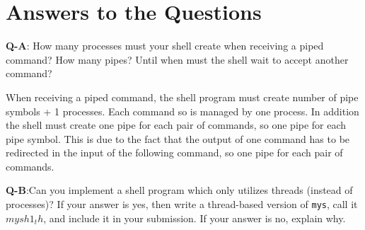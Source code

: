 





\maketitle

%
%
%
%
%



\section{Answers to the Questions}
\textbf{Q-A}: How many processes must your shell create when receiving a piped command? How many pipes? Until when must the shell wait to accept another command? \newline

When receiving a piped command, the shell program must create number of pipe symbols + 1 processes. Each command so is managed by one process. In addition the shell must create one pipe for each pair of commands, so one pipe for each pipe symbol. This is due to the fact that the output of one command has to be redirected in the input of the following command, so one pipe for each pair of commands.\newline


\textbf{Q-B}:Can you implement a shell program which only utilizes threads (instead of processes)? If your answer is yes, then write a thread-based version of \texttt{mys}, call it \texttt{$mysh1_th$}, and include it in your submission. If your answer is no, explain why. \newline

